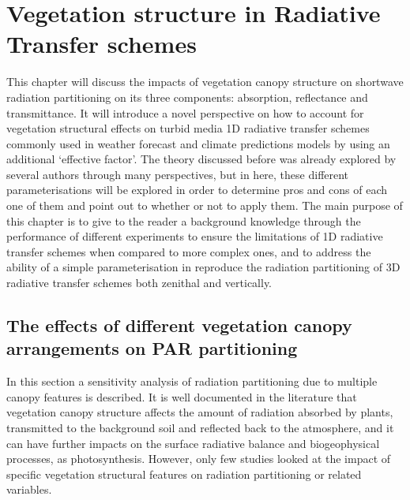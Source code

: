 \documentclass[a4paper,11pt]{report}
\title{}
\author{Renato Kerches Braghiere \\ This document was written in \LaTeX \\ Number of words: 18135}
\date{\today}
\begin{document}
\maketitle
\setcounter{chapter}{3} %

\tableofcontents
\listoffigures
\listoftables

\chapter{Vegetation structure in Radiative Transfer schemes}
This chapter will discuss the impacts of vegetation canopy structure on shortwave radiation partitioning on its three components: absorption, reflectance and transmittance. It will introduce a novel perspective on how to account for vegetation structural effects on turbid media 1D radiative transfer schemes commonly used in weather forecast and climate predictions models by using an additional `effective factor'. The theory discussed before was already explored by several authors through many perspectives, but in here, these different parameterisations will be explored in order to determine pros and cons of each one of them and point out to whether or not to apply them. The main purpose of this chapter is to give to the reader a background knowledge through the performance of different experiments to ensure the limitations of 1D radiative transfer schemes when compared to more complex ones, and to address the ability of a simple parameterisation in reproduce the radiation partitioning of 3D radiative transfer schemes both zenithal and vertically.

\section{The effects of different vegetation canopy arrangements on PAR partitioning}
In this section a sensitivity analysis of radiation partitioning due to multiple canopy features is described. It is well documented in the literature that vegetation canopy structure affects the amount of radiation absorbed by plants, transmitted to the background soil and reflected back to the atmosphere, and it can have further impacts on the surface radiative balance and biogeophysical processes, as photosynthesis. However, only few studies looked at the impact of specific vegetation structural features on radiation partitioning or related variables.
\end{document}
